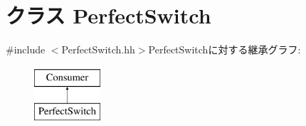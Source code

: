 \hypertarget{classPerfectSwitch}{
\section{クラス PerfectSwitch}
\label{classPerfectSwitch}
}


{\ttfamily \#include $<$PerfectSwitch.hh$>$}PerfectSwitchに対する継承グラフ:\begin{figure}[H]
\begin{center}
\leavevmode
\includegraphics[height=2cm]{classPerfectSwitch}
\end{center}
\end{figure}
